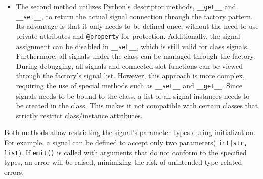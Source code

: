 \documentclass[
english,
ruledheaders=section,%
class=report,%
thesis={type=Report},%
accentcolor=9c,%
custommargins=true,%
marginpar=false,%
parskip=half-,%
fontsize=11pt,%
logofile={img/tuda_logo.pdf}, %
]{tudapub}
\begin{document}
\begin{itemize}
        \item The second method utilizes Python’s descriptor methods, \texttt{\_\_get\_\_} and \texttt{\_\_set\_\_}, to return the actual signal connection through the factory pattern. Its advantage is that it only needs to be defined once, without the need to use private attributes and \texttt{@property} for protection. Additionally, the signal assignment can be disabled in \texttt{\_\_set\_\_}, which is still valid for class signals. Furthermore, all signals under the class can be managed through the factory. During debugging, all signals and connected slot functions can be viewed through the factory's signal list. However, this approach is more complex, requiring the use of special methods such as \texttt{\_\_set\_\_} and \texttt{\_\_get\_\_}. Since signals needs to be bound to the class, a list of all signal instances needs to be created in the class. This makes it not compatible with certain classes that strictly restrict class/instance attributes.

    \end{itemize}

    Both methods allow restricting the signal’s parameter types during initialization. For example, a signal can be defined to accept only two parameters( \texttt{int|str, list}). If \texttt{emit()} is called with arguments that do not conform to the specified types, an error will be raised, minimizing the risk of unintended type-related errors.

\end{document}
